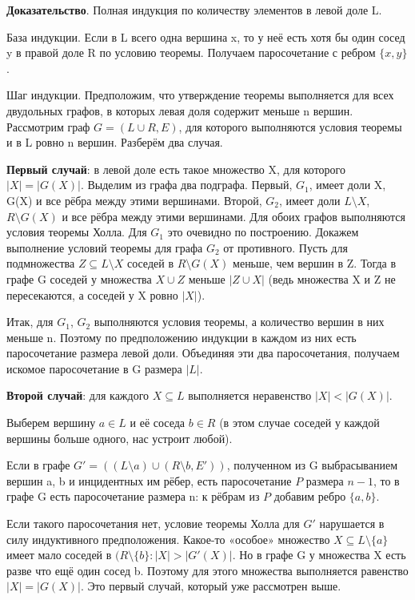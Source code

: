 \documentclass[a4paper, 10pt]{article}
\begin{document}
\medskip

\textbf{Доказательство}. Полная индукция по количеству элементов в левой доле L.

База индукции. Если в L всего одна вершина x, то у неё есть хотя бы один сосед y в правой доле R по условию теоремы. Получаем паросочетание с ребром $\{x, y\}$.

Шаг индукции. Предположим, что утверждение теоремы выполняется для всех двудольных графов, в которых левая доля содержит меньше n вершин. Рассмотрим граф $G = (L \cup R, E)$, для которого выполняются условия теоремы и в L ровно n вершин. Разберём два случая.

\smallskip

\textbf{Первый случай}: в левой доле есть такое множество X, для которого $|X| = |G(X)|$. Выделим из графа два подграфа. Первый, $G_1$, имеет доли X, G(X) и все рёбра между этими вершинами. Второй, $G_2$, имеет доли $L \setminus X$, $R \setminus G(X)$ и все рёбра между этими вершинами. Для обоих графов выполняются условия теоремы Холла. Для $G_1$ это очевидно по построению. Докажем выполнение условий теоремы для графа $G_2$ от противного. Пусть для подмножества $Z \subseteq L \setminus X$ соседей в $R \setminus G(X)$ меньше, чем вершин в Z. Тогда в графе G соседей у множества $X \cup Z$ меньше $|Z \cup X|$ (ведь множества X и Z не пересекаются, а соседей у X ровно $|X|$).

Итак, для $G_1$, $G_2$ выполняются условия теоремы, а количество вершин в них меньше n. Поэтому по предположению индукции в каждом из них есть паросочетание размера левой доли. Объединяя эти два паросочетания, получаем искомое паросочетание в G размера $|L|.$

\smallskip

\textbf{Второй случай}: для каждого $X \subseteq L$ выполняется неравенство $|X| < |G(X)|$.

Выберем вершину $a \in L$ и её соседа $b \in R$ (в этом случае соседей у каждой вершины больше одного, нас устроит любой).

Если в графе $G' = ((L \setminus {a}) \cup (R \setminus {b}, E'))$, полученном из G выбрасыванием вершин a, b и инцидентных им рёбер, есть паросочетание $P$ размера $n - 1$, то в графе G есть паросочетание размера n: к рёбрам из $P$ добавим ребро $\{a, b\}$.

Если такого паросочетания нет, условие теоремы Холла для $G'$ нарушается в силу индуктивного предположения. Какое-то «особое» множество $X \subseteq L \setminus \{a\}$ имеет мало соседей в $(R \setminus \{b\}: |X| > |G'(X)|$. Но в графе G у множества X есть разве что ещё один сосед b. Поэтому для этого множества выполняется равенство $|X| = |G(X)|$. Это первый случай, который уже рассмотрен выше.
\end{document}
